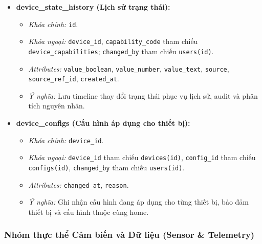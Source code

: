 \begin{itemize}
    \item \textbf{device\_state\_history (Lịch sử trạng thái):}
    \begin{itemize}
        \item \textit{Khóa chính:} \texttt{id}.
        \item \textit{Khóa ngoại:} \texttt{device\_id}, \texttt{capability\_code} tham chiếu \texttt{device\_capabilities}; \texttt{changed\_by} tham chiếu \texttt{users(id)}.
        \item \textit{Attributes:} \texttt{value\_boolean}, \texttt{value\_number}, \texttt{value\_text}, \texttt{source}, \texttt{source\_ref\_id}, \texttt{created\_at}.
        \item \textit{Ý nghĩa:} Lưu timeline thay đổi trạng thái phục vụ lịch sử, audit và phân tích nguyên nhân.
    \end{itemize}

    \item \textbf{device\_configs (Cấu hình áp dụng cho thiết bị):}
    \begin{itemize}
        \item \textit{Khóa chính:} \texttt{device\_id}.
        \item \textit{Khóa ngoại:} \texttt{device\_id} tham chiếu \texttt{devices(id)}, \texttt{config\_id} tham chiếu \texttt{configs(id)}, \texttt{changed\_by} tham chiếu \texttt{users(id)}.
        \item \textit{Attributes:} \texttt{changed\_at}, \texttt{reason}.
        \item \textit{Ý nghĩa:} Ghi nhận cấu hình đang áp dụng cho từng thiết bị, bảo đảm thiết bị và cấu hình thuộc cùng home.
    \end{itemize}
\end{itemize}

\subsubsection{Nhóm thực thể Cảm biến và Dữ liệu (Sensor \& Telemetry)}

